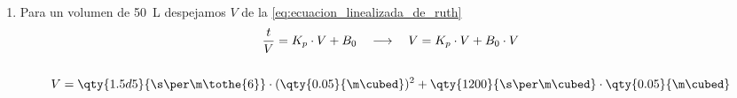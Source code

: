 {\begin{enumerate}
\begin{gather*}
            B_{0} = \frac{\mu \cdot R_{m}}{\Delta P \cdot A} \quad\longrightarrow\quad R_{m} = \frac{B_{0}\cdot A \cdot \Delta P}{\mu}
            \\\\
            R_{m} = \frac{\qty{1200}{\s\per\m\cubed}\cdot\qty{0.1}{\m\squared}\cdot\qty{2d5}{\pascal}}{\qty{1.2d-3}{\kg\per\m\per\s}} = \qty{2d10}{\per\m}
            \end{gather*}
        \item Para un volumen de \qty{50}{\L} despejamos $V$ de la \autoref{eq:ecuacion_linealizada_de_ruth} \begin{gather*}
            \frac{t}{V} = K_{p} \cdot V + B_{0} \quad\longrightarrow\quad V = K_{p} \cdot V + B_{0} \cdot V
            \\\\
            V = \qty{1.5d5}{\s\per\m\tothe{6}}\cdot(\qty{0.05}{\m\cubed})^{2} + \qty{1200}{\s\per\m\cubed}\cdot\qty{0.05}{\m\cubed}
        \end{gather*}
    \end{enumerate}
}